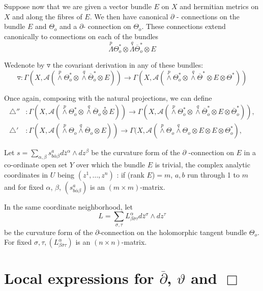 Suppose now that we are given a vector bundle $E$ on $X$ and hermitian
metrics on $X$ and along the fibres of $E$. We then have canonical
$\partial$ - connections on the bundle $E$ and $\Theta_o$ and a
$\partial$- connection on $\Theta_o$. These connections extend
canonically to connections on each of the bundles 
$$
\overset{p}{\Lambda} \Theta _o^* \otimes 
\overset{q}{\Lambda}\overline{\Theta}_o^* \otimes E
$$

We\pageoriginale denote by $\triangledown$ the covariant derivation in
any of these bundles: 
$$
\triangledown: \Gamma(X,\mathcal{A}(\overset {p}{\wedge}
\Theta^*_o \otimes \overset {q}{\wedge} \overline
{\Theta}^*_o \otimes E))\rightarrow \Gamma (X,
\mathcal{A}(\overset{p}\wedge \Theta^*_o \otimes
\overset {q}{\wedge} \overline {\Theta}^*\otimes E
\otimes \Theta^*))
$$

Once again, composing with the natural projections, we can define 
\begin{align*}
\triangle''& : \Gamma(X,\mathcal{A}(\overset {p}{\wedge}
\Theta^*_o \otimes \overset {q}{\wedge} \overline
            {\Theta}_o \overset{*} \otimes E))\rightarrow \Gamma
            (X, \mathcal{A}(\overset{p}\wedge \Theta^*_o \otimes
            \overset {q}{\wedge} \overline{\Theta}^*_o \otimes
            E \otimes \overline{\Theta}^*_o)),\\
 \triangle'& : \Gamma(X,\mathcal{A}(\overset {p}{\wedge}
 \Theta_o \overset {q}{\wedge} \overline{\Theta}_o
 \otimes E)) \rightarrow \Gamma (X, \mathcal{A}(\overset{p}\wedge
 \Theta_o \overset{q}\wedge \Theta_o \otimes E \otimes E
 \otimes \Theta^*_o),
\end{align*}

Let $s= \sum\limits_{\alpha, \beta} s^a_{b \bar{\alpha} \beta}  d
{\bar{z}}^\alpha \wedge dz^\beta$ be the curvature form of the
$\partial$ -connection on $E$ in a co-ordinate open set $Y$ over which
the bundle $E$ is trivial, the complex analytic coordinates in $U$ being
$(z^1, \ldots, z^n)$ : if (rank $E$)$=m$, $a,b$ run through 1 to $m$ and for
fixed $\alpha$, $\beta$, $(s^a_{b \overline{\alpha} \beta})$ is an $(m
\times m)$-matrix. 

In the same coordinate neighborhood, let
$$
L=\sum\limits_{\sigma, \tau} L^{\alpha}_{\beta \bar{\sigma} \tau} 
 d {\bar{z}}^\sigma  \wedge dz^\tau
$$
be the curvature form of the $\partial$-connection on the
holomorphic tangent bundle $\Theta_o$. For fixed $\sigma,
\tau, (L^{\alpha}_{\beta \bar{\sigma} \tau})$ is an
$(n \times n)$-matrix. 


\section{Local expressions for $\overline{\partial}$, $\vartheta$ 
  and $\Box$} %


